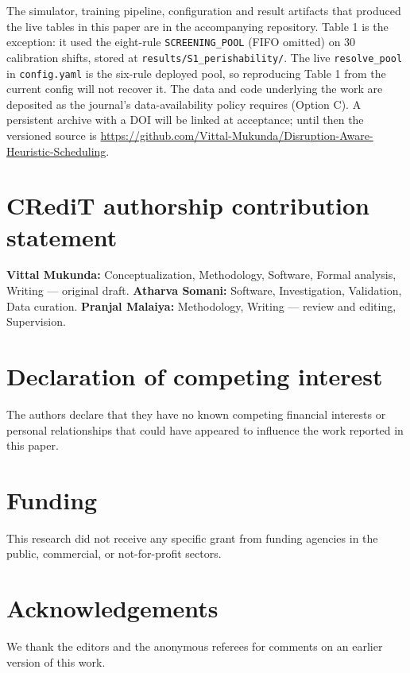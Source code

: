 \documentclass[review,3p,times]{elsarticle}
\theoremstyle{definition}
\begin{document}
The simulator, training pipeline, configuration and result artifacts
that produced the live tables in this paper are in the accompanying
repository. Table 1 is the exception: it used the eight-rule
\texttt{SCREENING\_POOL} (FIFO omitted) on 30 calibration shifts, stored
at \texttt{results/S1\_perishability/}. The live \texttt{resolve\_pool}
in \texttt{config.yaml} is the six-rule deployed pool, so reproducing
Table 1 from the current config will not recover it. The data and code
underlying the work are deposited as the journal's data-availability
policy requires (Option C). A persistent archive with a DOI will be
linked at acceptance; until then the versioned source is
\url{https://github.com/Vittal-Mukunda/Disruption-Aware-Heuristic-Scheduling}.

\section*{CRediT authorship contribution statement}

\textbf{Vittal Mukunda:} Conceptualization, Methodology, Software,
Formal analysis, Writing --- original draft. \textbf{Atharva Somani:}
Software, Investigation, Validation, Data curation. \textbf{Pranjal
Malaiya:} Methodology, Writing --- review and editing, Supervision.

\section*{Declaration of competing interest}

The authors declare that they have no known competing financial
interests or personal relationships that could have appeared to
influence the work reported in this paper.

\section*{Funding}

This research did not receive any specific grant from funding agencies
in the public, commercial, or not-for-profit sectors.

\section*{Acknowledgements}

We thank the editors and the anonymous referees for comments on an
earlier version of this work.
\end{document}
